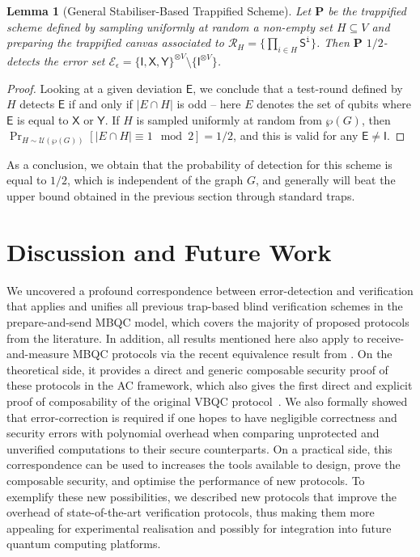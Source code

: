 \documentclass[12pt]{iopart}
\newcommand{\cptp}[1]{\mathsf{#1}} \newcommand{\pd}[1]{\mathcal{#1}}  \newcommand{\sch}[1]{\bm{#1}}
\newcommand{\X}{\cptp{X}}
\newcommand{\Y}{\cptp{Y}}
\renewcommand{\1}{\mathds{1}}
\newtheorem{lemma}{Lemma}
\begin{document}
\begin{lemma}[General Stabiliser-Based Trappified Scheme]
\label{lem:gen-trap-sch}
Let $\sch P$ be the trappified scheme defined by sampling uniformly at random a non-empty set $H \subseteq V$ and preparing the trappified canvas associated to $\mathcal{R}_H = \{\prod_{i \in H} \cptp S^{\mathtt{i}}\}$. Then $\sch P$ $1/2$-detects the error set $\mathcal{E}_\epsilon = \{\cptp I,\X,\Y\}^{\otimes V} \setminus \{ \cptp I^{\otimes V} \}$.
\end{lemma}
\begin{proof}
Looking at a given deviation $\cptp E$, we conclude that a test-round defined by $H$ detects $\cptp E$ if and only if $|E \cap H|$ is odd -- here $E$ denotes the set of qubits where $\cptp E$ is equal to $\X$ or $\Y$.
If $H$ is sampled uniformly at random from $\wp(G)$, then $\Pr_{H\sim \pd U(\wp(G))}\left[ |E \cap H| \equiv 1 \mod 2 \right] = 1/2$, and this is valid for any $\cptp E\neq \cptp I$.
\end{proof}

As a conclusion, we obtain that the probability of detection for this scheme is equal to $1/2$, which is independent of the graph $G$, and generally will beat the upper bound obtained in the previous section through standard traps.



 
\section{Discussion and Future Work}
\label{sec:concl}
We uncovered a profound correspondence between error-detection and verification that applies and unifies all previous trap-based blind verification schemes in the prepare-and-send MBQC model, which covers the majority of proposed protocols from the literature.  In addition, all results mentioned here also apply to receive-and-measure MBQC protocols via the recent equivalence result from \cite{WEP22:equivalence}.
On the theoretical side, it provides a direct and generic composable security proof of these protocols in the AC framework, which also gives the first direct and explicit proof of composability of the original VBQC protocol~\cite{FK17:unconditionally}.
We also formally showed that error-correction is required if one hopes to have negligible correctness and security errors with polynomial overhead when comparing unprotected and unverified computations to their secure counterparts.
On a practical side, this correspondence can be used to increases the tools available to design, prove the composable security, and optimise the performance of new protocols.
To exemplify these new possibilities, we described new protocols that improve the overhead of state-of-the-art verification protocols, thus making them more appealing for experimental realisation and possibly for integration into future quantum computing platforms.
\end{document}
